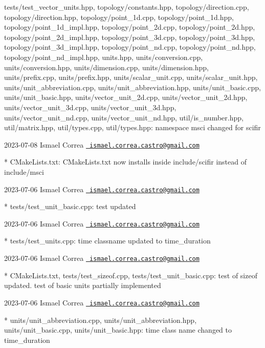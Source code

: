 \begin{DoxyVerb}
tests/test_vector_units.hpp, topology/constants.hpp,
topology/direction.cpp, topology/direction.hpp,
topology/point_1d.cpp, topology/point_1d.hpp,
topology/point_1d_impl.hpp, topology/point_2d.cpp,
topology/point_2d.hpp, topology/point_2d_impl.hpp,
topology/point_3d.cpp, topology/point_3d.hpp,
topology/point_3d_impl.hpp, topology/point_nd.cpp,
topology/point_nd.hpp, topology/point_nd_impl.hpp, units.hpp,
units/conversion.cpp, units/conversion.hpp, units/dimension.cpp,
units/dimension.hpp, units/prefix.cpp, units/prefix.hpp,
units/scalar_unit.cpp, units/scalar_unit.hpp,
units/unit_abbreviation.cpp, units/unit_abbreviation.hpp,
units/unit_basic.cpp, units/unit_basic.hpp,
units/vector_unit_2d.cpp, units/vector_unit_2d.hpp,
units/vector_unit_3d.cpp, units/vector_unit_3d.hpp,
units/vector_unit_nd.cpp, units/vector_unit_nd.hpp,
util/is_number.hpp, util/matrix.hpp, util/types.cpp, util/types.hpp: 
namespace msci changed for scifir
\end{DoxyVerb}
 2023-\/07-\/08 Ismael Correa \href{mailto:ismael.correa.castro@gmail.com}{\texttt{ ismael.\+correa.\+castro@gmail.\+com}} \begin{DoxyVerb}* CMakeLists.txt: CMakeLists.txt now installs inside include/scifir
instead of include/msci
\end{DoxyVerb}
 2023-\/07-\/06 Ismael Correa \href{mailto:ismael.correa.castro@gmail.com}{\texttt{ ismael.\+correa.\+castro@gmail.\+com}} \begin{DoxyVerb}* tests/test_unit_basic.cpp: test updated
\end{DoxyVerb}
 2023-\/07-\/06 Ismael Correa \href{mailto:ismael.correa.castro@gmail.com}{\texttt{ ismael.\+correa.\+castro@gmail.\+com}} \begin{DoxyVerb}* tests/test_units.cpp: time classname updated to time_duration
\end{DoxyVerb}
 2023-\/07-\/06 Ismael Correa \href{mailto:ismael.correa.castro@gmail.com}{\texttt{ ismael.\+correa.\+castro@gmail.\+com}} \begin{DoxyVerb}* CMakeLists.txt, tests/test_sizeof.cpp, tests/test_unit_basic.cpp: 
test of sizeof updated. test of basic units partially implemented
\end{DoxyVerb}
 2023-\/07-\/06 Ismael Correa \href{mailto:ismael.correa.castro@gmail.com}{\texttt{ ismael.\+correa.\+castro@gmail.\+com}} \begin{DoxyVerb}* units/unit_abbreviation.cpp, units/unit_abbreviation.hpp,
units/unit_basic.cpp, units/unit_basic.hpp: time class name changed
to time_duration
\end{DoxyVerb}
